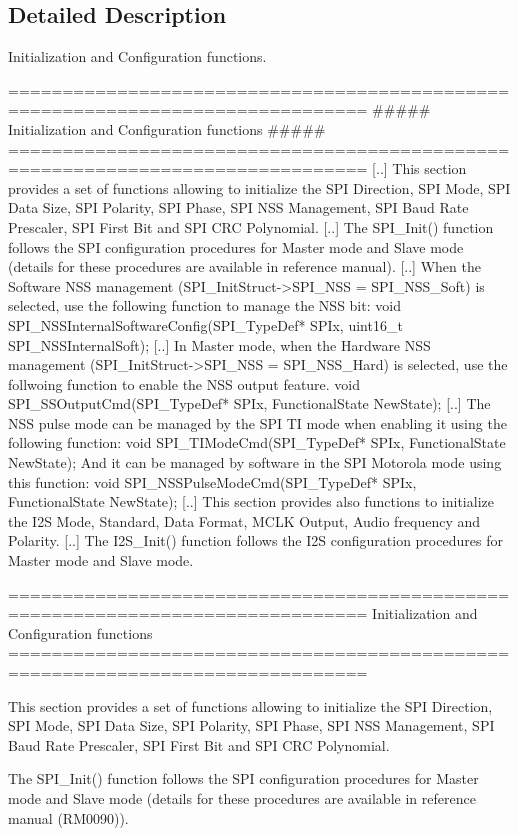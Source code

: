 \subsection{Detailed Description}
Initialization and Configuration functions. \begin{DoxyVerb} ===============================================================================
           ##### Initialization and Configuration functions #####
 ===============================================================================  
    [..] This section provides a set of functions allowing to initialize the SPI Direction,
         SPI Mode, SPI Data Size, SPI Polarity, SPI Phase, SPI NSS Management, SPI Baud
         Rate Prescaler, SPI First Bit and SPI CRC Polynomial.
    [..] The SPI_Init() function follows the SPI configuration procedures for Master mode
         and Slave mode (details for these procedures are available in reference manual).
    [..] When the Software NSS management (SPI_InitStruct->SPI_NSS = SPI_NSS_Soft) is selected,
         use the following function to manage the NSS bit:
         void SPI_NSSInternalSoftwareConfig(SPI_TypeDef* SPIx, uint16_t SPI_NSSInternalSoft);
    [..] In Master mode, when the Hardware NSS management (SPI_InitStruct->SPI_NSS = SPI_NSS_Hard)
         is selected, use the follwoing function to enable the NSS output feature.
         void SPI_SSOutputCmd(SPI_TypeDef* SPIx, FunctionalState NewState);
    [..] The NSS pulse mode can be managed by the SPI TI mode when enabling it using the 
         following function: void SPI_TIModeCmd(SPI_TypeDef* SPIx, FunctionalState NewState);
         And it can be managed by software in the SPI Motorola mode using this function: 
         void SPI_NSSPulseModeCmd(SPI_TypeDef* SPIx, FunctionalState NewState);
    [..] This section provides also functions to initialize the I2S Mode, Standard, 
         Data Format, MCLK Output, Audio frequency and Polarity.
    [..] The I2S_Init() function follows the I2S configuration procedures for Master mode
         and Slave mode.\end{DoxyVerb}


\begin{DoxyVerb} ===============================================================================
                  Initialization and Configuration functions
 ===============================================================================  

  This section provides a set of functions allowing to initialize the SPI Direction,
  SPI Mode, SPI Data Size, SPI Polarity, SPI Phase, SPI NSS Management, SPI Baud
  Rate Prescaler, SPI First Bit and SPI CRC Polynomial.
  
  The SPI_Init() function follows the SPI configuration procedures for Master mode
  and Slave mode (details for these procedures are available in reference manual
  (RM0090)).\end{DoxyVerb}
 

